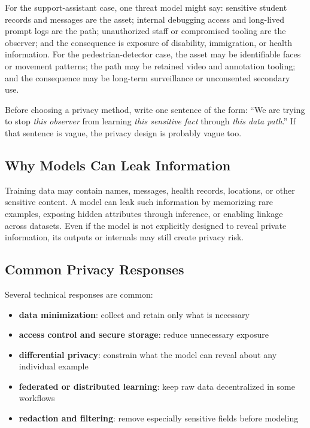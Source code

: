 For the support-assistant case, one threat model might say: sensitive student records and messages are the asset; internal debugging access and long-lived prompt logs are the path; unauthorized staff or compromised tooling are the observer; and the consequence is exposure of disability, immigration, or health information. For the pedestrian-detector case, the asset may be identifiable faces or movement patterns; the path may be retained video and annotation tooling; and the consequence may be long-term surveillance or unconsented secondary use.

\begin{decisionbox}
Before choosing a privacy method, write one sentence of the form: ``We are trying to stop \emph{this observer} from learning \emph{this sensitive fact} through \emph{this data path}.'' If that sentence is vague, the privacy design is probably vague too.
\end{decisionbox}

\subsection{Why Models Can Leak Information}

Training data may contain names, messages, health records, locations, or other sensitive content. A model can leak such information by memorizing rare examples, exposing hidden attributes through inference, or enabling linkage across datasets. Even if the model is not explicitly designed to reveal private information, its outputs or internals may still create privacy risk.

\subsection{Common Privacy Responses}

Several technical responses are common:
\begin{itemize}[leftmargin=*]
\item \textbf{data minimization}: collect and retain only what is necessary
\item \textbf{access control and secure storage}: reduce unnecessary exposure
\item \textbf{differential privacy}: constrain what the model can reveal about any individual example
\item \textbf{federated or distributed learning}: keep raw data decentralized in some workflows
\item \textbf{redaction and filtering}: remove especially sensitive fields before modeling
\end{itemize}

